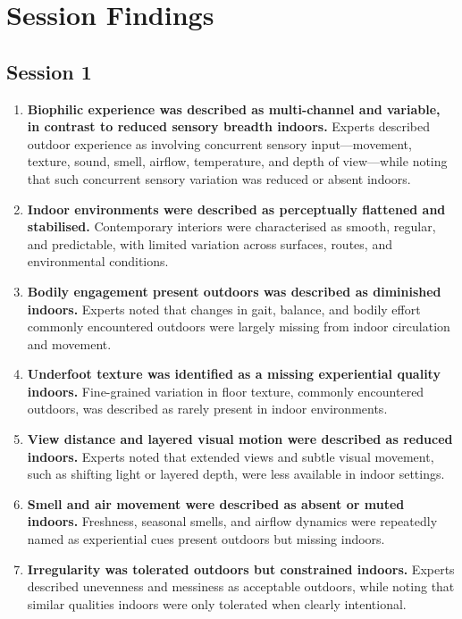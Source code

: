 \section{Session Findings}

\subsection{Session 1}
\label{apx-s1}
\begin{enumerate}
\item \textbf{Biophilic experience was described as multi-channel and variable, in contrast to reduced sensory breadth indoors.} Experts described outdoor experience as involving concurrent sensory input—movement, texture, sound, smell, airflow, temperature, and depth of view—while noting that such concurrent sensory variation was reduced or absent indoors.

\item \textbf{Indoor environments were described as perceptually flattened and stabilised.}  Contemporary interiors were characterised as smooth, regular, and predictable, with limited variation across surfaces, routes, and environmental conditions.

\item \textbf{Bodily engagement present outdoors was described as diminished indoors.}  Experts noted that changes in gait, balance, and bodily effort commonly encountered outdoors were largely missing from indoor circulation and movement.

\item \textbf{Underfoot texture was identified as a missing experiential quality indoors.}  Fine-grained variation in floor texture, commonly encountered outdoors, was described as rarely present in indoor environments.

\item \textbf{View distance and layered visual motion were described as reduced indoors.}  Experts noted that extended views and subtle visual movement, such as shifting light or layered depth, were less available in indoor settings.

\item \textbf{Smell and air movement were described as absent or muted indoors.}  Freshness, seasonal smells, and airflow dynamics were repeatedly named as experiential cues present outdoors but missing indoors.

\item \textbf{Irregularity was tolerated outdoors but constrained indoors.}  Experts described unevenness and messiness as acceptable outdoors, while noting that similar qualities indoors were only tolerated when clearly intentional.


\end{enumerate}
